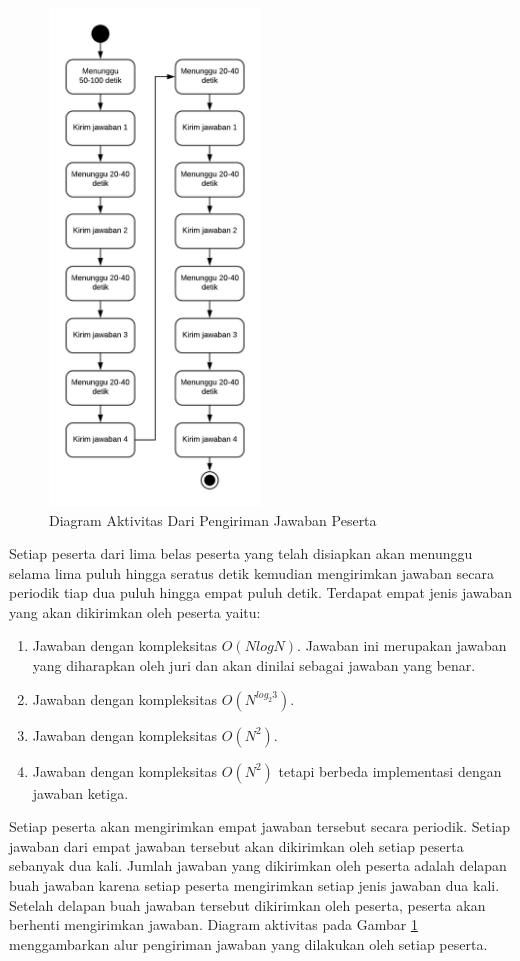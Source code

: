 \begin{figure}[ht!]
    \centering
    \includegraphics[width=0.5\textwidth]{images/performance-testing-activity}
    \caption{Diagram Aktivitas Dari Pengiriman Jawaban Peserta}
    \label{fig:performance-testing-activity}
\end{figure}

\par Setiap peserta dari lima belas peserta yang telah disiapkan akan menunggu selama lima puluh hingga seratus detik kemudian mengirimkan jawaban secara periodik tiap dua puluh hingga empat puluh detik. Terdapat empat jenis jawaban yang akan dikirimkan oleh peserta yaitu:
\begin{enumerate}
    \item Jawaban dengan kompleksitas $O(N log N)$. Jawaban ini merupakan jawaban yang diharapkan oleh juri dan akan dinilai sebagai jawaban yang benar.
    \item Jawaban dengan kompleksitas $O(N^{log_2{3}})$.
    \item Jawaban dengan kompleksitas $O(N^2)$.
    \item Jawaban dengan kompleksitas $O(N^2)$ tetapi berbeda implementasi dengan jawaban ketiga.
\end{enumerate}
Setiap peserta akan mengirimkan empat jawaban tersebut secara periodik. Setiap jawaban dari empat jawaban tersebut akan dikirimkan oleh setiap peserta sebanyak dua kali. Jumlah jawaban yang dikirimkan oleh peserta adalah delapan buah jawaban karena setiap peserta mengirimkan setiap jenis jawaban dua kali. Setelah delapan buah jawaban tersebut dikirimkan oleh peserta, peserta akan berhenti mengirimkan jawaban. Diagram aktivitas pada Gambar \ref{fig:performance-testing-activity} menggambarkan alur pengiriman jawaban yang dilakukan oleh setiap peserta.

